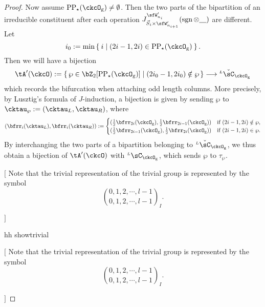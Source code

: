 \documentclass[12pt,a4paper]{amsart}
\newcommand{\trivial}[2][]{\if\relax\detokenize{#1}\relax
  {%
      \color{orange} \vspace{0em} $[$  #2 $]$
      \color{black}
  }
  \else
\ifx#1h
\ifcsname showtrivial\endcsname
{%
    \color{orange} \vspace{0em}  $[$ #2 $]$
    \color{black}
}
\fi
\else {\red Wrong argument!} \fi
\fi
}
\newcommand{\sgn}{\operatorname{sgn}}
\numberwithin{equation}{section}
\theoremstyle{remark}
\def\half{{\tfrac{1}{2}}}
\def\LC{{}^{\scriptscriptstyle L}\sC}
\def\ckLC{{}^{\scriptscriptstyle L}\check{\sC}}
\def\ckLC{{}^{\scriptscriptstyle L}\check\sC}
\def\CPPs{\mathrm{PP}_{\star}}
\begin{document}
\begin{proof}
    Now assume $\CPPs(\ckcO_{\mathrm g})\neq \emptyset$. Then the two parts of the
    bipartition of an irreducible constituent after each operation
    $J_{\vec{S}_{i}\times \sfW'_{n_{i+1}}}^{\sfW'_{n_{i}}}(\sgn \otimes \underline{\ \ \ })$ are different. Let
    \[i_{0}:= \min\Set{i| (2i-1,2i)\in \CPPs(\ckcO_{\mathrm g})}.\]
    Then we will have a bijection
    \[
      \tA'(\ckcO):= \set{\wp\in \bZ_{2}[\CPPs(\ckcO_{\mathrm g})]|(2i_{0}-1,2i_{0})\notin \wp} \longrightarrow \ckLC_{\ckcO_{\mathrm g}}
    \]
    which records the bifurcation when attaching odd length columns. More precisely, by Lusztig's formula of $J$-induction, a bijection is given by sending
      $\wp$ to $\cktau_{\wp}:= (\cktau_{L},\cktau_{R})$, where
    \[
      (\bfrr_{i}(\cktau_{L}),\bfrr_{i}(\cktau_{R})) := \begin{cases} (\half\bfrr_{2i}(\ckcO_{\mathrm g}),\half\bfrr_{2i-1}(\ckcO_{\mathrm g}))
        & \text{if } (2i-1,2i)\notin \wp ,\\
        (\half\bfrr_{2i-1}(\ckcO_{\mathrm g}),\half\bfrr_{2i}(\ckcO_{\mathrm g}))
        & \text{if } (2i-1,2i)\in \wp .\\
      \end{cases}
    \]
    By interchanging the two parts of a bipartition belonging to $\ckLC_{\ckcO_{\mathrm g}}$, we thus obtain a bijection of $\tA'(\ckcO)$ with $\LC_{\ckcO_{\mathrm g}}$, which sends $\wp$ to $\tau_{\wp}$.


    \trivial[h]{ Note that the trivial representation of the trivial group is
      represented by the symbol
      \[
        \binom{0,1, 2, \cdots, l-1}{0,1,2, \cdots, l-1}_{I}.
      \]

}
\end{proof}
\end{document}
